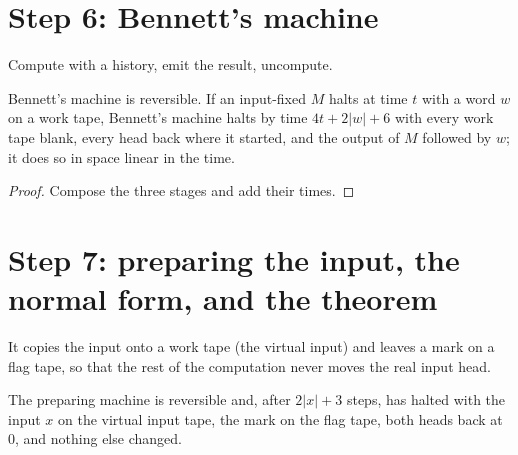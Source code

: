 \section{Step 6: Bennett's machine}

\begin{definition}
  \label{def:bennettTM}
  \leanok
  Compute with a history, emit the result, uncompute.
\end{definition}

\begin{theorem}
  \label{thm:bennettTM}
  \leanok
  Bennett's machine is reversible. If an input-fixed $M$ halts at time $t$ with a word $w$ on a work
  tape, Bennett's machine halts by time $4t + 2|w| + 6$ with every work tape blank, every head back
  where it started, and the output of $M$ followed by $w$; it does so in space linear in the time.
\end{theorem}

\begin{proof}
  \leanok
  Compose the three stages and add their times.
\end{proof}

\section{Step 7: preparing the input, the normal form, and the theorem}

\begin{definition}
  \label{def:prepTM}
  \leanok
  It copies the input onto a work tape (the virtual input) and leaves a mark on a flag tape, so that
  the rest of the computation never moves the real input head.
  \own{}
\end{definition}

\begin{theorem}
  \label{thm:prepTM}
  \leanok
  The preparing machine is reversible and, after $2|x| + 3$ steps, has halted with the input $x$ on
  the virtual input tape, the mark on the flag tape, both heads back at $0$, and nothing else changed.
\end{theorem}

